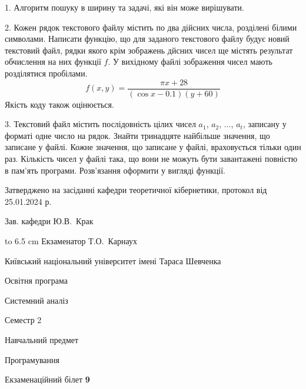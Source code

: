 \documentclass[12pt, ukrainian]{article}
\begin{document}
{%
1. Алгоритм пошуку в ширину та задачі, які він може вирішувати.%
\par
\vspace{2mm}

2. Кожен рядок текстового файлу містить по два дійсних числа, розділені білими символами.
Написати функцію, що для заданого текстового файлу будує новий текстовий файл, рядки якого крім зображень дйсних чисел ще містять результат обчислення на них функції $f$. У вихідному файлі зображення чисел мають розділятися пробілами. 
$$f(x, y) =\frac{\pi x + 28}{(\cos x - 0.1) (y + 60)}$$ 
Якість коду також оцінюється.

\par
\vspace{2mm}

3. Текстовий файл містить послідовність цілих чисел $a_1$, $a_2$, $\ldots$, $a_t$, записану у форматі одне число на рядок. Знайти тринадцяте найбільше значення, що записане у файлі. Кожне значення, що записане у файлі, враховується тільки один раз. Кількість чисел у файлі така, що вони не можуть бути завантажені повністю в пам'ять програми. Розв'язання оформити у вигляді функції.

}
{\smallskip\smallskip \begin {scriptsize} Затверджено на засіданні кафедри теоретичної кібернетики, протокол   від   25.01.2024 р.\par\smallskip\smallskip\smallskip\smallskip
{\parbox {6.5 cm} {Зав. кафедри \dotfill Ю.В.~Крак}}\hspace {0.7cm} {\hbox to 6.5 cm { Екзаменатор \dotfill Т.О.~Карнаух}} \end{scriptsize}}
\newpage
{{\begin {scriptsize}\par
{ \center  Київський національний університет імені Тараса Шевченка \par}
{\parbox {5 cm}{Освітня програма \hfill}{\parbox {7 cm}{Системний аналіз\hfill}}\parbox {6 cm}{\hfill Семестр 2}}\par
{\parbox {5 cm} {Навчальний предмет \hfill}\parbox {7 cm}{Програмування \hfill}\parbox {6cm}{\hfill}\par}\vspace{-15pt} \end{scriptsize}}{\center Екзаменаційний білет \No \textbf { 9 }\par}}
\end{document}
